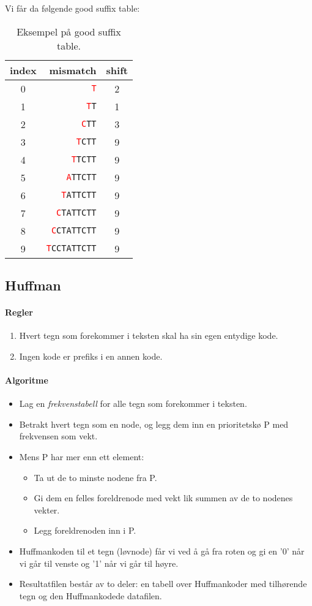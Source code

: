 \documentclass[11pt,a4paper]{article}
\theoremstyle{def}
\begin{document}
\noindent Vi får da følgende good suffix table:
\begin{table}[h!]
\centering
\begin{tabular}{crc}
index&mismatch&shift\\
\hline
0&\texttt{\textcolor{red}{T}}&2\\
1&\texttt{\textcolor{red}{T}T}&1\\
2&\texttt{\textcolor{red}{C}TT}&3\\
3&\texttt{\textcolor{red}{T}CTT}&9\\
4&\texttt{\textcolor{red}{T}TCTT}&9\\
5&\texttt{\textcolor{red}{A}TTCTT}&9\\
6&\texttt{\textcolor{red}{T}ATTCTT}&9\\
7&\texttt{\textcolor{red}{C}TATTCTT}&9\\
8&\texttt{\textcolor{red}{C}CTATTCTT}&9\\
9&\texttt{\textcolor{red}{T}CCTATTCTT}&9\\
\end{tabular}
\caption{Eksempel på good suffix table.}
\label{tab:gst}
\end{table}

\newpage
\subsection{Huffman}
\paragraph{Regler}
\begin{enumerate}
\item
Hvert tegn som forekommer i teksten skal ha sin egen entydige kode.
\item
Ingen kode er prefiks i en annen kode.
\end{enumerate}

\paragraph{Algoritme}
\begin{itemize}
\item
Lag en \textit{frekvenstabell} for alle tegn som forekommer i teksten.
\item
Betrakt hvert tegn som en node, og legg dem inn en prioritetskø P med frekvensen som vekt.
\item
Mens P har mer enn ett element:
\begin{itemize}
\item
Ta ut de to minste nodene fra P.
\item
Gi dem en felles foreldrenode med vekt lik summen av de to nodenes vekter.
\item
Legg foreldrenoden inn i P.
\end{itemize}
\item
Huffmankoden til et tegn (løvnode) får vi ved å gå fra roten og gi en '0' når vi går til venste og '1' når vi går til høyre.
\item
Resultatfilen består av to deler: en tabell over Huffmankoder med tilhørende tegn og den Huffmankodede datafilen.
\end{itemize}
\end{document}
